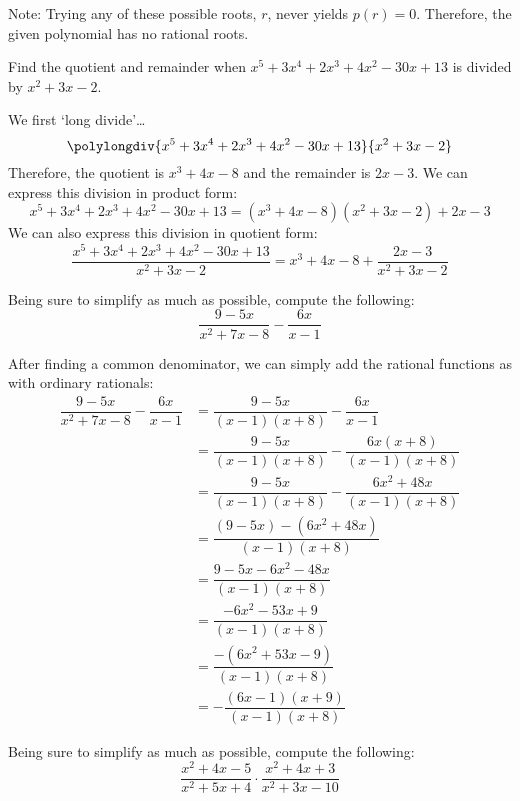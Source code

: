 \documentclass[12pt,letterpaper]{exam}
\begin{document}
\begin{questions}
\vfill

Note: Trying any of these possible roots, $r$, never yields $p(r)= 0$. Therefore, the given polynomial has no rational roots. 



\newpage
\question[10] Find the quotient and remainder when $x^5 + 3x^4 + 2x^3 + 4x^2 - 30x + 13$ is divided by $x^2 + 3x - 2$. \pspace

\sol We first `long divide'\dots
	\[
	\polylongdiv{x^5 + 3x^4 + 2x^3 + 4x^2 - 30x + 13}{x^2 + 3x - 2}
	\]
Therefore, the quotient is $x^3 + 4x - 8$ and the remainder is $2x - 3$. We can express this division in product form:
	\[
	x^5 + 3x^4 + 2x^3 + 4x^2 - 30x + 13= (x^3 + 4x - 8)(x^2 + 3x - 2) + 2x - 3
	\]
We can also express this division in quotient form:
	\[
	\dfrac{x^5 + 3x^4 + 2x^3 + 4x^2 - 30x + 13}{x^2 + 3x - 2}= x^3 + 4x - 8 + \dfrac{2x - 3}{x^2 + 3x - 2}
	\]



\newpage
\question[10] Being sure to simplify as much as possible, compute the following:
	\[
	\dfrac{9 - 5x}{x^2 + 7x - 8} - \dfrac{6x}{x - 1}
	\] \pspace

\sol After finding a common denominator, we can simply add the rational functions as with ordinary rationals:
	\[
	\begin{aligned}
	\dfrac{9 - 5x}{x^2 + 7x - 8} - \dfrac{6x}{x - 1}&= \dfrac{9 - 5x}{(x - 1)(x + 8)} - \dfrac{6x}{x - 1} \\[0.3cm]
	&= \dfrac{9 - 5x}{(x - 1)(x + 8)} - \dfrac{6x(x + 8)}{(x - 1)(x + 8)} \\[0.3cm]
	&= \dfrac{9 - 5x}{(x - 1)(x + 8)} - \dfrac{6x^2 + 48x}{(x - 1)(x + 8)} \\[0.3cm]
	&= \dfrac{(9 - 5x) - (6x^2 + 48x)}{(x - 1)(x + 8)} \\[0.3cm]
	&= \dfrac{9 - 5x - 6x^2 - 48x}{(x - 1)(x + 8)} \\[0.3cm]
	&= \dfrac{-6x^2 - 53x + 9}{{(x - 1)(x + 8)}} \\[0.3cm]
	&= \dfrac{-(6x^2 + 53x - 9)}{{(x - 1)(x + 8)}} \\[0.3cm]
	&= -\dfrac{(6x - 1)(x + 9)}{{(x - 1)(x + 8)}}
	\end{aligned}
	\]



\newpage
\question[10] Being sure to simplify as much as possible, compute the following:
	\[
	\dfrac{x^2 + 4x - 5}{x^2 + 5x + 4} \cdot \dfrac{x^2 + 4x + 3}{x^2 + 3x - 10}
	\] \pspace


\end{questions}
\end{document}
